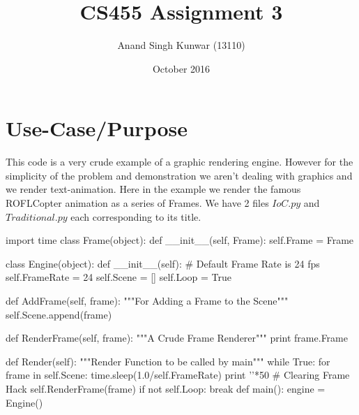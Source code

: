 \documentclass{article}
\title{CS455 Assignment 3}
\author{Anand Singh Kunwar (13110) }
\date{October 2016}
\begin{document}
\maketitle

\section{Use-Case/Purpose}
This code is a very crude example of a graphic rendering engine. However for the
simplicity of the problem and demonstration we aren't dealing with graphics and
we render text-animation. Here in the example we render the famous ROFLCopter
animation as a series of Frames. We have 2 files $IoC.py$ and $Traditional.py$
each corresponding to its title.
\begin{python}[caption=IoC.py]
import time                                                                     
class Frame(object):                                                            
    def __init__(self, Frame):                                                  
        self.Frame = Frame                                                      
                                                                                
class Engine(object):                                                           
    def __init__(self):                                                         
        # Default Frame Rate is 24 fps                                          
        self.FrameRate = 24                                                     
        self.Scene = []                                                         
        self.Loop = True                                                        

    def AddFrame(self, frame):                                                  
        """For Adding a Frame to the Scene"""                                   
        self.Scene.append(frame)                                                

    def RenderFrame(self, frame):                                               
        """A Crude Frame Renderer"""                                            
        print frame.Frame                                                       

    def Render(self):                                                           
        """Render Function to be called by main"""                              
        while True:                                                             
            for frame in self.Scene:                                            
                time.sleep(1.0/self.FrameRate)                                  
                print '\n'*50   # Clearing Frame Hack                           
                self.RenderFrame(frame)                                         
            if not self.Loop:                                                   
                break                                                           
def main():                                                                     
    engine = Engine()                                                           


\end{python}
\end{document}
